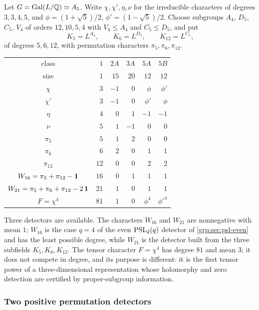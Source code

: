 Let $G=\operatorname{Gal}(L/\mathbb{Q})\simeq A_5$. Write $\chi,\chi',\eta,\nu$ for the irreducible
characters of degrees $3,3,4,5$, and $\phi=(1+\sqrt5)/2$, $\phi'=(1-\sqrt5)/2$.
Choose subgroups $A_4$, $D_5$, $C_5$, $V_4$ of orders $12,10,5,4$ with
$V_4\le A_4$ and $C_5\le D_5$, and put
\[
 K_5=L^{A_4},\qquad K_6=L^{D_5},\qquad K_{12}=L^{C_5},
\]
of degrees $5,6,12$, with permutation characters $\pi_5,\pi_6,\pi_{12}$.
\begin{center}
\begin{tabular}{c|rrrrr}
\toprule
class&$1$&$2A$&$3A$&$5A$&$5B$\\
size&$1$&$15$&$20$&$12$&$12$\\\midrule
$\chi$&$3$&$-1$&$0$&$\phi$&$\phi'$\\
$\chi'$&$3$&$-1$&$0$&$\phi'$&$\phi$\\
$\eta$&$4$&$0$&$1$&$-1$&$-1$\\
$\nu$&$5$&$1$&$-1$&$0$&$0$\\\midrule
$\pi_5$&$5$&$1$&$2$&$0$&$0$\\
$\pi_6$&$6$&$2$&$0$&$1$&$1$\\
$\pi_{12}$&$12$&$0$&$0$&$2$&$2$\\\midrule
$W_{16}=\pi_5+\pi_{12}-\mathbf{1}$&$16$&$0$&$1$&$1$&$1$\\
$W_{21}=\pi_5+\pi_6+\pi_{12}-2\,\mathbf{1}$&$21$&$1$&$0$&$1$&$1$\\
$F=\chi^4$&$81$&$1$&$0$&$\phi^4$&$\phi'^4$\\
\bottomrule
\end{tabular}
\end{center}
Three detectors are available. The characters $W_{16}$ and $W_{21}$ are
nonnegative with mean $1$; $W_{16}$ is the case $q=4$ of the even
$\operatorname{PSL}_2(q)$ detector of \cref{grp:sec:psl-even} and has the least possible
degree, while $W_{21}$ is the detector built from the three subfields
$K_5,K_6,K_{12}$. The tensor character $F=\chi^4$ has degree $81$ and mean
$3$; it does not compete in degree, and its purpose is different: it is the
first tensor power of a three-dimensional representation whose holomorphy and
zero detection are certified by proper-subgroup information.

\subsubsection{Two positive permutation detectors}

